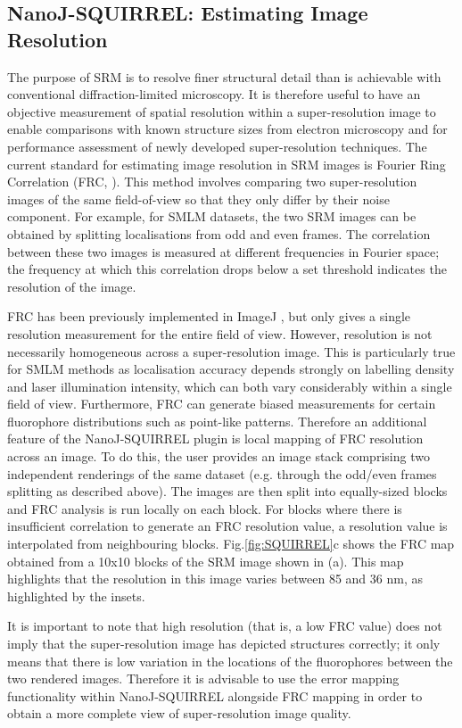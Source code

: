 \subsection*{NanoJ-SQUIRREL: Estimating Image Resolution}
The purpose of SRM is to resolve finer structural detail than is achievable with conventional diffraction-limited microscopy. It is therefore useful to have an objective measurement of spatial resolution within a super-resolution image to enable comparisons with known structure sizes from electron microscopy and for performance assessment of newly developed super-resolution techniques. The current standard for estimating image resolution in SRM images is Fourier Ring Correlation (FRC, \cite{nieuwenhuizen2013measuring}). This method involves comparing two super-resolution images of the same field-of-view so that they only differ by their noise component. For example, for SMLM datasets, the two SRM images can be obtained by splitting localisations from odd and even frames. The correlation between these two images is measured at different frequencies in Fourier space; the frequency at which this correlation drops below a set threshold indicates the resolution of the image.

FRC has been previously implemented in ImageJ \cite{nieuwenhuizen2013measuring}, but only gives a single resolution measurement for the entire field of view. However, resolution is not necessarily homogeneous across a super-resolution image. This is particularly true for SMLM methods as localisation accuracy depends strongly on labelling density and laser illumination intensity, which can both vary considerably within a single field of view. Furthermore, FRC can generate biased measurements for certain fluorophore distributions such as point-like patterns. Therefore an additional feature of the NanoJ-SQUIRREL plugin is local mapping of FRC resolution across an image. To do this, the user provides an image stack comprising two independent renderings of the same dataset (e.g. through the odd/even frames splitting as described above). The images are then split into equally-sized blocks and FRC analysis is run locally on each block. For blocks where there is insufficient correlation to generate an FRC resolution value, a resolution value is interpolated from neighbouring blocks. Fig.\ref{fig:SQUIRREL}c shows the FRC map obtained from a 10x10 blocks of the SRM image shown in (a). This map highlights that the resolution in this image varies between 85 and 36 nm, as highlighted by the insets.

It is important to note that high resolution (that is, a low FRC value) does not imply that the super-resolution image has depicted structures correctly; it only means that there is low variation in the locations of the fluorophores between the two rendered images. Therefore it is advisable to use the error mapping functionality within NanoJ-SQUIRREL alongside FRC mapping in order to obtain a more complete view of super-resolution image quality.


